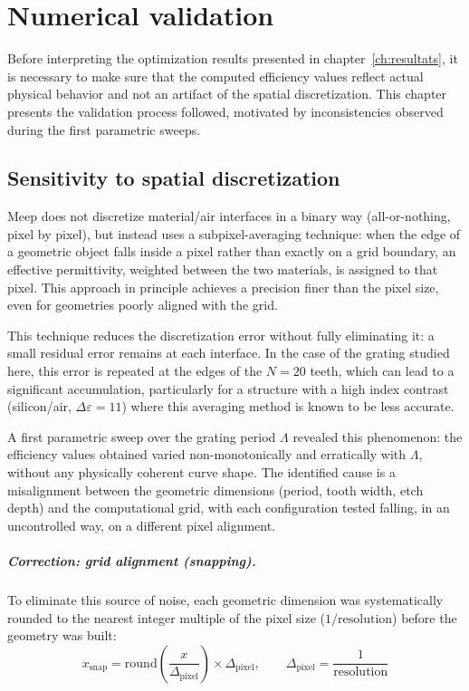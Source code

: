 \documentclass[a4paper,11pt]{report}
\begin{document}
\chapter{Numerical validation}
\label{ch:validation}


Before interpreting the optimization results presented in chapter~\ref{ch:resultats}, it is necessary to make sure that the computed efficiency values reflect actual physical behavior and not an artifact of the spatial discretization. This chapter presents the validation process followed, motivated by inconsistencies observed during the first parametric sweeps.

\section{Sensitivity to spatial discretization}

Meep does not discretize material/air interfaces in a binary way (all-or-nothing, pixel by pixel), but instead uses a subpixel-averaging technique: when the edge of a geometric object falls inside a pixel rather than exactly on a grid boundary, an effective permittivity, weighted between the two materials, is assigned to that pixel. This approach in principle achieves a precision finer than the pixel size, even for geometries poorly aligned with the grid.

This technique reduces the discretization error without fully eliminating it: a small residual error remains at each interface. In the case of the grating studied here, this error is repeated at the edges of the $N=20$ teeth, which can lead to a significant accumulation, particularly for a structure with a high index contrast (silicon/air, $\Delta\varepsilon=11$) where this averaging method is known to be less accurate.

A first parametric sweep over the grating period $\Lambda$ revealed this phenomenon: the efficiency values obtained varied non-monotonically and erratically with $\Lambda$, without any physically coherent curve shape. The identified cause is a misalignment between the geometric dimensions (period, tooth width, etch depth) and the computational grid, with each configuration tested falling, in an uncontrolled way, on a different pixel alignment.

\paragraph{Correction: grid alignment (\emph{snapping}).} To eliminate this source of noise, each geometric dimension was systematically rounded to the nearest integer multiple of the pixel size ($1/\text{resolution}$) before the geometry was built:
\begin{equation}
x_{\text{snap}} = \text{round}\left(\frac{x}{\Delta_{\text{pixel}}}\right)\times\Delta_{\text{pixel}}, \qquad \Delta_{\text{pixel}}=\frac{1}{\text{resolution}}
\label{eq:snap}
\end{equation}
\end{document}
